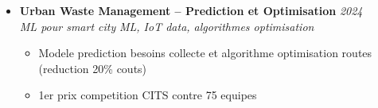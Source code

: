 \documentclass[a4paper,11pt]{article}
\begin{document}
\begin{itemize}[leftmargin=*, label={-}]
\item \textbf{Urban Waste Management -- Prediction et Optimisation} \hfill \textit{2024} \\
\textit{ML pour smart city} \hfill \textit{ML, IoT data, algorithmes optimisation}
\vspace{-2pt}
    \begin{itemize}[leftmargin=0.4cm, nosep, label=\tiny$\bullet$]
        \item \small{Modele prediction besoins collecte et algorithme optimisation routes (reduction 20\% couts)}
        \item \small{1er prix competition CITS contre 75 equipes}
    \end{itemize}

\end{itemize}
\end{document}
